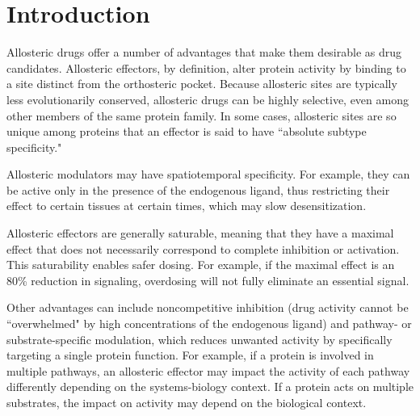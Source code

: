 \section{Introduction}
\par Allosteric drugs offer a number of advantages that make them desirable as drug candidates. Allosteric effectors, by definition, alter protein activity by binding to a site distinct from the orthosteric pocket. Because allosteric sites are typically less evolutionarily conserved, allosteric drugs can be highly selective, even among other members of the same protein family.\cite{Christopoulos2004a,Groebe2006a,May2007a,Kenakin2010a,Nussinov2012a,Szilagyi2013a,Grover2013a,Ma2014a} In some cases, allosteric sites are so unique among proteins that an effector is said to have ``absolute subtype specificity."\cite{Gunasekaran2004a,Groebe2006a,May2007a,Wenthur2014}
\par Allosteric modulators may  have spatiotemporal specificity. For example, they can be  active only in the presence of the endogenous ligand, thus restricting their effect  to certain tissues at certain times,\cite{May2007a,Gunasekaran2004a,Kenakin2010a,Groebe2006a,Groebe2009a} which may slow desensitization.\cite{Csermelya2013, Wenthur2014}
\par Allosteric effectors are generally saturable, meaning that they have a maximal effect that does not necessarily correspond to complete inhibition or activation.\cite{Nussinov2012a,Kenakin2010a,Ma2014a,Groebe2006a,Wenthur2014,Groebe2009a,Szilagyi2013a} This saturability enables safer dosing. For example, if the maximal effect is an 80\% reduction in signaling, overdosing will not fully eliminate an essential signal.\cite{Christopoulos2004a,Kenakin2010a,Groebe2006a}
\par Other advantages can include noncompetitive inhibition (\ie drug activity cannot be ``overwhelmed" by high concentrations of the endogenous ligand) and pathway- or substrate-specific modulation, which reduces unwanted activity by specifically targeting a single protein function.\cite{Kenakin2010a,Groebe2006a,Wenthur2014} For example, if a protein is involved in multiple pathways, an allosteric effector may impact the activity of each pathway differently depending on the systems-biology context. If a protein acts on multiple substrates, the impact on activity may depend on the biological context.
